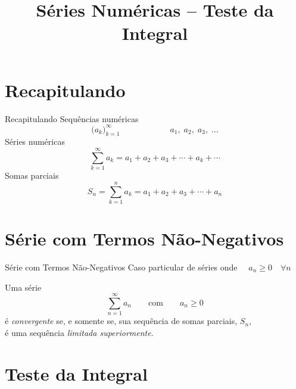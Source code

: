 
\usepackage{integracao_e_series}

\title{Séries Numéricas -- Teste da Integral}



\addtitle

\section{Recapitulando}

\begin{frame}{Recapitulando}
  Sequências numéricas
  \[
    \big( a_k \big)_{k=1}^\infty \qquad\qquad\qquad a_1,\; a_2,\; a_3,\; \dots
  \]
  \pause
  Séries numéricas
  \[
    \sum_{k=1}^\infty a_k = a_1 + a_2 + a_3 + \cdots + a_k + \cdots
  \]
  \pause
  Somas parciais
  \[
    S_n = \sum_{k=1}^n a_k = a_1 + a_2 + a_3 + \cdots + a_n
  \]
\end{frame}

\section{Série com Termos Não-Negativos}

\begin{frame}{Série com Termos Não-Negativos}
  Caso particular de séries onde $\quad a_n \geq 0 \quad \forall n$

  \pause
  \vspace{\baselineskip}
  Uma série
  \[\sum_{n=1}^\infty a_n \qquad \text{com} \qquad a_n\geq 0 \]
  é \emph{convergente} se, e somente se, sua sequência de somas parciais, $S_n$, \\
  é uma sequência \emph{limitada superiormente}.
\end{frame}

\section{Teste da Integral}

